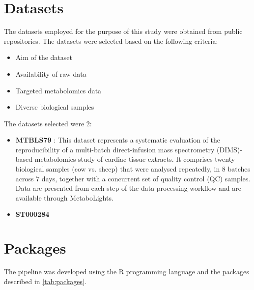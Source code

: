 \documentclass[ENG, BIB]{TFUOC}%
\begin{document}
\section{Datasets} 
The datasets employed for the purpose of this study were obtained from public repositories.
The datasets were selected based on the following criteria:
\begin{itemize}
    \item Aim of the dataset
    \item Availability of raw data
    \item Targeted metabolomics data
    \item Diverse biological samples
\end{itemize}

The datasets selected were 2:
\begin{itemize}
    \item \textbf{MTBLS79} \cite{kirwanDirectInfusionMass2014}: This dataset represents a systematic evaluation of the reproducibility of a multi-batch direct-infusion mass spectrometry (DIMS)-based metabolomics study of cardiac tissue extracts. It comprises twenty biological samples (cow vs. sheep) that were analysed repeatedly, in 8 batches across 7 days, together with a concurrent set of quality control (QC) samples. Data are presented from each step of the data processing workflow and are available through MetaboLights. 
    \item \textbf{ST000284} \cite{zhuColorectalCancerDetection2014} 

\end{itemize}
\section{Packages} 
The pipeline was developed using the R programming language \cite{R} and the packages described in \ref{tab:packages}.
\end{document}
